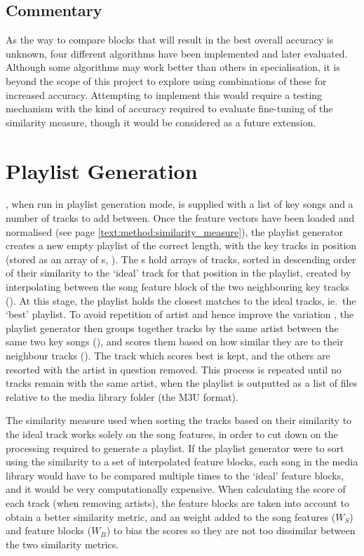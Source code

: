 \subsection{Commentary}
As the way to compare blocks that will result in the best overall accuracy is unknown, four different algorithms have been implemented and later evaluated. Although some algorithms may work better than others in specialisation, it is beyond the scope of this project to explore using combinations of these for increased accuracy. Attempting to implement this would require a testing mechanism with the kind of accuracy required to evaluate fine-tuning of the similarity measure, though it would be considered as a future extension.
\section{Playlist Generation}
, when run in playlist generation mode, is supplied with a list of key songs and a number of tracks to add between. Once the feature vectors have been loaded and normalised (see page \ref{text:method:similarity_measure}), the playlist generator creates a new empty playlist of the correct length, with the key tracks in position (stored as an array of s, ). The s hold arrays of tracks, sorted in descending order of their similarity to the `ideal' track for that position in the playlist, created by interpolating between the song feature block of the two neighbouring key tracks (). At this stage, the playlist holds the closest matches to the ideal tracks, ie.\ the `best' playlist. To avoid repetition of artist and hence improve the variation \citep{Pauws2002}, the playlist generator then groups together tracks by the same artist between the same two key songs (), and scores them based on how similar they are to their neighbour tracks (). The track which scores best is kept, and the others are resorted with the artist in question removed. This process is repeated until no tracks remain with the same artist, when the playlist is outputted as a list of files relative to the media library folder (the M3U format).

The similarity measure used when sorting the tracks based on their similarity to the ideal track works solely on the song features, in order to cut down on the processing required to generate a playlist. If the playlist generator were to sort using the similarity to a set of interpolated feature blocks, each song in the media library would have to be compared multiple times to the `ideal' feature blocks, and it would be very computationally expensive. When calculating the score of each track (when removing artists), the feature blocks are taken into account to obtain a better similarity metric, and an weight added to the song features ($W_S$) and feature blocks ($W_B$) to bias the scores so they are not too dissimilar between the two similarity metrics.

